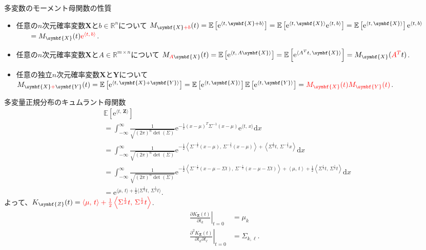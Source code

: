 \documentclass[lualatex,handout]{beamer}
\newcommand{\mycolor}[2]{%
  \begingroup
  \colorlet{currentcolor}{.}%
  \color{#1}#2%
  \color{currentcolor}%
  \endgroup
}
\newcommand{\emm}[1]{\mycolor{red}{#1}}
\newcommand{\expt}[1]{\mathbb{E}\left[#1\right]}
\theoremstyle{definition}
\begin{document}
\begin{frame}{多変数のモーメント母関数の性質}
\small
\begin{itemize}
\setlength{\itemsep}{3em}
\item 任意の$n$次元確率変数$\symbf{X}$と$b\in\mathbb{R}^n$について
$M_{{\symbf{X}}\emm{+b}}(t) = \expt{\mathrm{e}^{\langle t,\, {\symbf{X}}+b\rangle}} = \expt{\mathrm{e}^{\langle t,\,\symbf{X}\rangle}\mathrm{e}^{\langle t,\,b\rangle}} = \expt{\mathrm{e}^{\langle t,\, {\symbf{X}}\rangle}}\mathrm{e}^{\langle t,\,b\rangle}$\\
$\qquad = M_{\symbf{X}}(t)\emm{\mathrm{e}^{\langle t,\, b\rangle}}$.
\item 任意の$n$次元確率変数$\symbf{X}$と$A\in\mathbb{R}^{m\times n}$について
$M_{\emm{A}{\symbf{X}}}(t) = \expt{\mathrm{e}^{\langle t,\, A{\symbf{X}}\rangle}} = \expt{\mathrm{e}^{\langle A^Tt,\, {\symbf{X}}\rangle}} = M_{\symbf{X}}(\emm{A^T}t)$.
\item 任意の独立$n$次元確率変数$\symbf{X}$と$\symbf{Y}$について
$M_{{\symbf{X}}\emm{+}{\symbf{Y}}}(t) = \expt{\mathrm{e}^{\langle t,\, {\symbf{X}}+{\symbf{Y}}\rangle}} = \expt{\mathrm{e}^{\langle t,\, {\symbf{X}}\rangle}}\expt{\mathrm{e}^{\langle t,\, {\symbf{Y}}\rangle}}= \emm{M_{\symbf{X}}(t)M_{\symbf{Y}}(t)}$.
\end{itemize}
\end{frame}

\begin{frame}{多変量正規分布のキュムラント母関数}
\small
\begin{align*}
&\expt{\mathrm{e}^{\langle t,\,\symbf{Z}\rangle}}\\
&=\int_{-\infty}^\infty \frac1{\sqrt{(2\pi)^n\det(\Sigma)}} \mathrm{e}^{-\frac12 (x-\mu)^T\Sigma^{-1} (x-\mu)}\mathrm{e}^{\langle t,\, x\rangle}\mathrm{d}x\\
&= \int_{-\infty}^\infty \frac1{\sqrt{(2\pi)^n\det(\Sigma)}} \mathrm{e}^{-\frac12 \left\langle\Sigma^{-\frac12}(x-\mu),\,\Sigma^{-\frac12}(x-\mu)\right\rangle+\left\langle \Sigma^{\frac12}t,\, \Sigma^{-\frac12}x\right\rangle}\mathrm{d}x\\
&= \int_{-\infty}^\infty \frac1{\sqrt{(2\pi)^n\det(\Sigma)}} \mathrm{e}^{-\frac12 \left\langle\Sigma^{-\frac12}(x-\mu-\Sigma t),\,\Sigma^{-\frac12}(x-\mu-\Sigma t)\right\rangle +\left\langle \mu,\, t\right\rangle + \frac12\left\langle \Sigma^\frac12t,\,\Sigma^\frac12t\right\rangle}\mathrm{d}x\\
&= \mathrm{e}^{\langle \mu,\, t\rangle + \frac12\langle \Sigma^\frac12t,\,\Sigma^\frac12t\rangle}.
\end{align*}
よって、$K_{\symbf{Z}}(t) = \emm{\langle \mu,\, t\rangle + \frac12\left\langle \Sigma^\frac12t,\,\Sigma^\frac12t\right\rangle}$.
\begin{align*}
\left.\frac{\partial K_{\symbf{Z}}(t)}{\partial t_k}\right|_{t=0} &= \mu_k\\
\left.\frac{\partial^2 K_{\symbf{Z}}(t)}{\partial t_k\partial t_\ell}\right|_{t=0} &= \Sigma_{k, \ell}.
\end{align*}
\end{frame}
\end{document}
